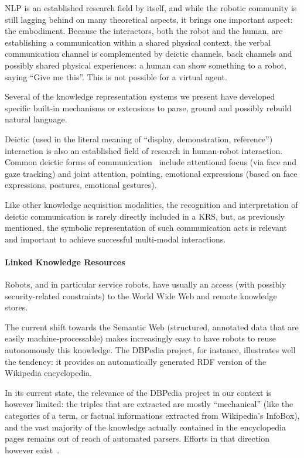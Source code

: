 NLP is an established research field by itself, and while the robotic community
is still lagging behind on many theoretical aspects, it brings one important
aspect: the embodiment. Because the interactors, both the robot and the human,
are establishing a communication within a shared physical context, the verbal
communication channel is complemented by deictic channels, back channels and
possibly shared physical experiences: a human can show something to a robot,
saying ``Give me this''. This is not possible for a virtual agent.

Several of the knowledge representation systems we present have developed
specific built-in mechanisms or extensions to parse, ground and possibly
rebuild natural language.

Deictic (used in the literal meaning of ``display, demonstration, reference'')
interaction is also an established field of research in human-robot
interaction. Common deictic forms of communication~\cite{Li2012} include
attentional focus (via face and gaze tracking) and joint attention, pointing,
emotional expressions (based on face expressions, postures, emotional
gestures).

Like other knowledge acquisition modalities, the recognition and interpretation
of deictic communication is rarely directly included in a KRS, but, as
previously mentioned, the symbolic representation of such communication acts is
relevant and important to achieve successful multi-modal interactions.

\paragraph{Linked Knowledge Resources}
\label{sect|lod}

Robots, and in particular service robots, have usually an access (with possibly
security-related constraints) to the World Wide Web and remote knowledge stores.

The current shift towards the Semantic Web (\ie structured, annotated data that
are easily machine-processable) makes increasingly easy to have robots to reuse
autonomously this knowledge. The DBPedia project, for instance, illustrates
well the tendency: it provides an automatically generated RDF version of the
Wikipedia encyclopedia.

In its current state, the relevance of the DBPedia project in our context is
however limited: the triples that are extracted are mostly ``mechanical'' (like
the categories of a term, or factual informations extracted from Wikipedia's
InfoBox), and the vast majority of the knowledge actually contained in the
encyclopedia pages remains out of reach of automated parsers. Efforts in that
direction however exist~\cite{Nyga2009, Fader2011}.

